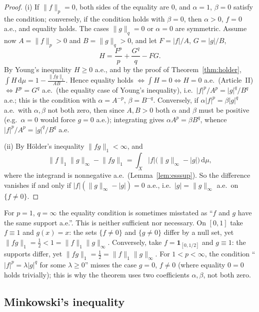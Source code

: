 \documentclass[11pt]{article}
\newcommand{\norm}[1]{\lVert #1\rVert}
\newcommand{\dmu}{\,\mathrm{d}\mu}
\newcommand{\ind}{\mathbf{1}}
\begin{document}
\begin{proof}
(i) If $\norm{f}_{p}=0$, both sides of the equality are $0$, and $\alpha=1$, $\beta=0$ satisfy the condition; conversely, if the condition holds with $\beta=0$, then $\alpha>0$, $f=0$ a.e., and equality holds. The cases $\norm{g}_{q}=0$ or $\alpha=0$ are symmetric. Assume now $A=\norm{f}_{p}>0$ and $B=\norm{g}_{q}>0$, and let $F=|f|/A$, $G=|g|/B$,
\[
H=\frac{F^{p}}{p}+\frac{G^{q}}{q}-FG .
\]
By Young's inequality $H\ge0$ a.e., and by the proof of Theorem~\ref{thm:holder}, $\int H\dmu=1-\frac{\norm{fg}_{1}}{AB}$. Hence equality holds $\iff\int H=0\iff H=0$ a.e.\ (Article~II) $\iff F^{p}=G^{q}$ a.e.\ (the equality case of Young's inequality), i.e.\ $|f|^{p}/A^{p}=|g|^{q}/B^{q}$ a.e.; this is the condition with $\alpha=A^{-p}$, $\beta=B^{-q}$. Conversely, if $\alpha|f|^{p}=\beta|g|^{q}$ a.e.\ with $\alpha,\beta$ not both zero, then since $A,B>0$ both $\alpha$ and $\beta$ must be positive (e.g.\ $\alpha=0$ would force $g=0$ a.e.); integrating gives $\alpha A^{p}=\beta B^{q}$, whence $|f|^{p}/A^{p}=|g|^{q}/B^{q}$ a.e.

(ii) By Hölder's inequality $\norm{fg}_{1}<\infty$, and
\[
\norm{f}_{1}\norm{g}_{\infty}-\norm{fg}_{1}=\int_{X}|f|\bigl(\norm{g}_{\infty}-|g|\bigr)\dmu ,
\]
where the integrand is nonnegative a.e.\ (Lemma~\ref{lem:esssup}). So the difference vanishes if and only if $|f|(\norm{g}_{\infty}-|g|)=0$ a.e., i.e.\ $|g|=\norm{g}_{\infty}$ a.e.\ on $\{f\ne0\}$.
\end{proof}

\begin{example}\label{ex:holder-eq}
For $p=1$, $q=\infty$ the equality condition is sometimes misstated as ``$f$ and $g$ have the same support a.e.''. This is neither sufficient nor necessary. On $[0,1]$ take $f\equiv1$ and $g(x)=x$: the sets $\{f\ne0\}$ and $\{g\ne0\}$ differ by a null set, yet $\norm{fg}_{1}=\tfrac12<1=\norm{f}_{1}\norm{g}_{\infty}$. Conversely, take $f=\ind_{[0,1/2]}$ and $g\equiv1$: the supports differ, yet $\norm{fg}_{1}=\tfrac12=\norm{f}_{1}\norm{g}_{\infty}$. For $1<p<\infty$, the condition ``$|f|^{p}=\lambda|g|^{q}$ for some $\lambda\ge0$'' misses the case $g=0$, $f\ne0$ (where equality $0=0$ holds trivially); this is why the theorem uses two coefficients $\alpha,\beta$, not both zero.
\end{example}

\subsection{Minkowski's inequality}
\end{document}
